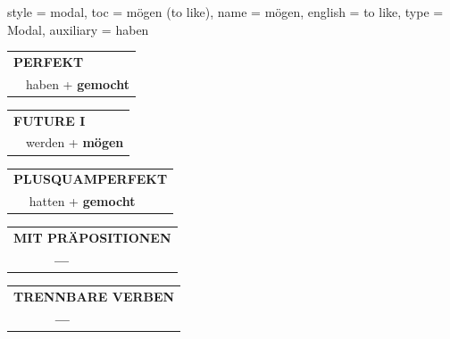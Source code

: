 \begin{verbentry}{
  style = {modal},
  toc = {mögen (to like)},
  name = {mögen},
  english = {to like},
  type = {Modal},
  auxiliary = {haben}
}
    \vspace{10pt}
 
    \begin{tabular}{rl}
     \multicolumn{2}{l}{\textbf{PERFEKT}}\\
  &  haben + \textbf{gemocht}\\
  \end{tabular}
\hfill
   \begin{tabular}{rl}
   
    \multicolumn{2}{l}{\textbf{FUTURE I} }\\
  &  werden + \textbf{mögen}\\
 
  \end{tabular}
\hfill
   \begin{tabular}{rl}
      \multicolumn{2}{l}{\textbf{PLUSQUAMPERFEKT}}\\
   & hatten + \textbf{gemocht}\\
  \end{tabular}
  
  
\vspace{10pt}

\begin{tabular}{lll}
\multicolumn{3}{l}{\textbf{MIT PRÄPOSITIONEN}}\\
& \textbf{---} & \\
\end{tabular}
\hfill
\begin{tabular}{lll}
\multicolumn{3}{l}{\textbf{TRENNBARE VERBEN}}\\
& \textbf{---} & \\
\end{tabular}
\vspace{-5pt}
\end{verbentry}

